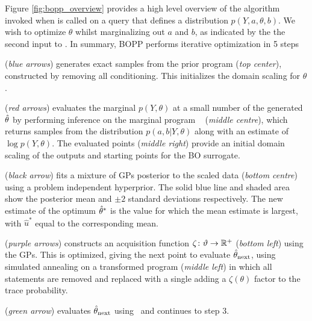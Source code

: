 Figure \ref{fig:bopp_overview} provides a high level overview of the algorithm invoked when \doopt is called on a query  that defines a distribution $p\left(Y, a, \theta , b\right)$.  We wish to optimize $\theta$ whilst marginalizing out $a$ and $b$, as indicated by the the second input to . In summary, BOPP performs iterative optimization in 5 steps
\begin{description}[align=left]
	\setlength\itemsep{-0.1em}
	\item[Step 1] (\emph{blue arrows}) generates exact samples from the prior program  (\emph{top center}), constructed by removing all conditioning. This initializes the domain scaling for $\theta$.
	\item[Step 2] (\emph{red arrows}) evaluates the marginal $p(Y,\theta)$ at a small number of the generated $\hat{\theta}$ by performing inference on the marginal program \qmarg~ (\emph{middle centre}), which returns samples from the distribution $p\left(a,b | Y, \theta\right)$ along with an estimate of $\log p(Y, \theta)$.  The evaluated points (\emph{middle right}) provide an initial domain scaling of the outputs and starting points for the BO surrogate.
	\item[Step 3] (\emph{black arrow}) fits a mixture of GPs posterior
	to the scaled data (\emph{bottom centre}) using a problem independent hyperprior. The solid blue line and shaded area show the posterior mean and $\pm2$ standard deviations respectively. The new estimate of the optimum $\hat{\theta}^*$ is the value for which the mean estimate is largest, with $\hat{u}^*$ equal to the corresponding mean.    
	\item[Step 4] (\emph{purple arrows}) constructs an acquisition function $\zeta \colon \vartheta \rightarrow \mathbb{R}^+$ (\emph{bottom left}) using the GPs.  This is optimized, giving the next point to evaluate $\hat{\theta}_{\mathrm{next}}$, using simulated annealing on a transformed program  (\emph{middle left}) in which all \observe statements are removed and replaced with a single \observe adding a $\zeta(\theta)$ factor to the trace probability. %
	\item[Step 5] (\emph{green arrow}) evaluates $\hat{\theta}_{\mathrm{next}}$ using \qmarg~and continues to step 3.
\end{description}


